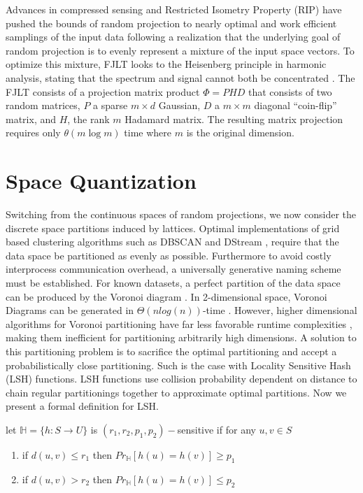 Advances in compressed sensing and Restricted Isometry Property (RIP) have pushed the bounds of random projection to
nearly optimal and work efficient samplings of the input data following a realization that the underlying goal of random
projection is to evenly represent a mixture of the input space vectors.  To optimize this mixture, FJLT looks to the
Heisenberg principle in harmonic analysis, stating that the spectrum and signal cannot both be
concentrated \cite{ailon2006}.  The FJLT consists of a projection matrix product $\Phi = PHD$ that consists of two random
matrices, $P$ a sparse $m\times d$ Gaussian, $D$ a $m\times m$ diagonal ``coin-flip'' matrix, and $H$, the rank $m$
Hadamard matrix.  The resulting matrix projection requires only $\theta(m \log m)$ time where $m$ is the original
dimension.

\section{Space Quantization} 
Switching from the continuous spaces of random projections, we now consider the discrete space partitions induced by
lattices.  Optimal implementations of grid based clustering algorithms such as DBSCAN \cite{dbscan} and DStream \cite{cao-06}, require
that the data space be partitioned as evenly as possible.  Furthermore to avoid costly interprocess communication
overhead, a universally generative naming scheme must be established.  For known datasets, a perfect partition of the
data space can be produced by the Voronoi diagram \cite{Klein1988}.  In 2-dimensional space, Voronoi Diagrams can be
generated in $\Theta(n log(n))$-time \cite{Fortune}.  However, higher dimensional algorithms for Voronoi partitioning
have far less favorable runtime complexities \cite{Gavrilova2003}, making them inefficient for partitioning arbitrarily
high dimensions.
A solution to this partitioning problem is to sacrifice the optimal partitioning and accept a probabilistically  
close partitioning.  Such is the case with Locality Sensitive Hash (LSH) functions. 
LSH functions use collision probability dependent on distance to chain regular partitionings together to
approximate optimal partitions. Now we present a formal definition for LSH. 
\begin{Definition}
let $\mathbb{H}=\{h:S \rightarrow U\}$ is $(r_1,r_2,p_1,p_2)-$sensitive if for 
any $u,v\in S$
 \begin{enumerate}
   \item if $d(u,v) \leq r_1$ then $Pr_{\mathbb{H}}[h(u)=h(v)]\geq p_1$
   \item if $d(u,v) > r_2$ then $Pr_{\mathbb{H}}[h(u)=h(v)]\leq p_2$
 \end{enumerate}
\end{Definition}

